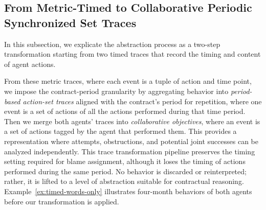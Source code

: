  \subsection{From Metric-Timed to Collaborative Periodic Synchronized Set Traces}
 
 In this subsection, we explicate the abstraction process as a two-step transformation starting from two timed traces that record the timing and content of agent actions.
 
 From these metric traces, where each event is a tuple of action and time point, we impose the contract-period granularity by aggregating behavior into \emph{period-based action-set traces} aligned with the contract’s period for repetition, where one event is a set of actions of all the actions performed during that time period.
 Then we merge both agents' traces into \emph{collaborative objectives}, where an event is a set of actions tagged by the agent that performed them.
 This provides a representation where attempts, obstructions, and potential joint successes can be analyzed independently.
 This trace transformation pipeline preserves the timing setting required for blame assignment, although it loses the timing of actions performed during the same period.
 No behavior is discarded or reinterpreted; rather, it is lifted to a level of abstraction suitable for contractual reasoning.
 Example~\ref{ex:timed-words-only} illustrates four-month behaviors of both agents before our transformation is applied.
 
